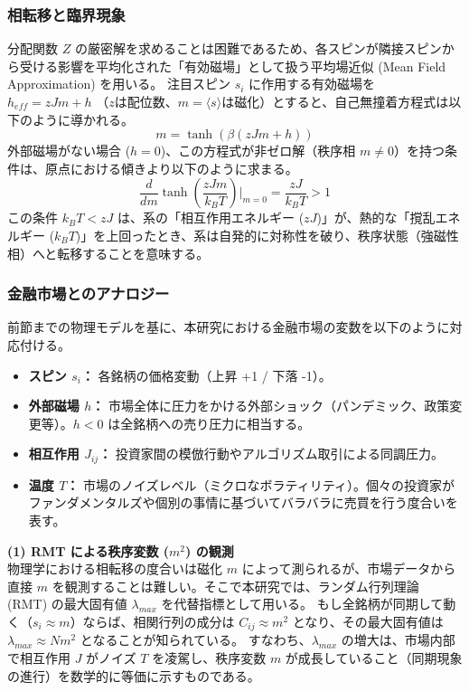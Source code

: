 \documentclass[11pt,a4paper,oneside]{ltjsarticle}
\begin{document}
\subsubsection{相転移と臨界現象}
分配関数 $Z$ の厳密解を求めることは困難であるため、各スピンが隣接スピンから受ける影響を平均化された「有効磁場」として扱う平均場近似 (Mean Field Approximation) を用いる。
注目スピン $s_i$ に作用する有効磁場を $h_{eff} = zJm + h$ （$z$は配位数、$m=\langle s \rangle$は磁化）とすると、自己無撞着方程式は以下のように導かれる。
\begin{equation}
m = \tanh(\beta(zJm + h))
\end{equation}
外部磁場がない場合 ($h=0$)、この方程式が非ゼロ解（秩序相 $m \neq 0$）を持つ条件は、原点における傾きより以下のように求まる。
\begin{equation}
\frac{d}{dm} \tanh\left(\frac{zJm}{k_B T}\right) \bigg|_{m=0} = \frac{zJ}{k_B T} > 1
\end{equation}
この条件 $k_B T < zJ$ は、系の「相互作用エネルギー ($zJ$)」が、熱的な「撹乱エネルギー ($k_B T$)」を上回ったとき、系は自発的に対称性を破り、秩序状態（強磁性相）へと転移することを意味する。

\subsubsection{金融市場とのアナロジー}
前節までの物理モデルを基に、本研究における金融市場の変数を以下のように対応付ける。

\begin{itemize}
    \item \textbf{スピン $s_i$：} 各銘柄の価格変動（上昇 +1 / 下落 -1）。
    \item \textbf{外部磁場 $h$：} 市場全体に圧力をかける外部ショック（パンデミック、政策変更等）。$h < 0$ は全銘柄への売り圧力に相当する。
    \item \textbf{相互作用 $J_{ij}$：} 投資家間の模倣行動やアルゴリズム取引による同調圧力。
    \item \textbf{温度 $T$：} 市場のノイズレベル（ミクロなボラティリティ）。個々の投資家がファンダメンタルズや個別の事情に基づいてバラバラに売買を行う度合いを表す。
\end{itemize}

\textbf{(1) RMT による秩序変数 ($m^2$) の観測} \\
物理学における相転移の度合いは磁化 $m$ によって測られるが、市場データから直接 $m$ を観測することは難しい。そこで本研究では、ランダム行列理論 (RMT) の最大固有値 $\lambda_{max}$ を代替指標として用いる。
もし全銘柄が同期して動く（$s_i \approx m$）ならば、相関行列の成分は $C_{ij} \approx m^2$ となり、その最大固有値は $\lambda_{max} \approx N m^2$ となることが知られている。
すなわち、$\lambda_{max}$ の増大は、市場内部で相互作用 $J$ がノイズ $T$ を凌駕し、秩序変数 $m$ が成長していること（同期現象の進行）を数学的に等価に示すものである。
\end{document}
